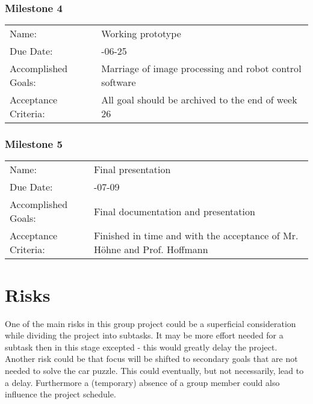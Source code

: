 \documentclass[a4paper, 12pt]{scrartcl}%
\newcommand{\explanation}[1]{{\sffamily #1}}
\begin{document}
	\subsubsection*{Milestone 4}
	\begin{tabular}{lp{10cm}}
		Name:      & \explanation{Working prototype}\\
		Due Date: & \explanation{2019-06-25}\\
		Accomplished Goals: & \explanation{Marriage of image processing and robot control software}\\
		Acceptance Criteria: & \explanation{All goal should be archived to the end of week 26}
	\end{tabular}
	\subsubsection*{Milestone 5}
	\begin{tabular}{lp{10cm}}
		Name:      & \explanation{Final presentation}\\
		Due Date: & \explanation{2019-07-09}\\
		Accomplished Goals: & \explanation{Final documentation and presentation}\\
		Acceptance Criteria: & \explanation{Finished in time and with the acceptance of Mr. Höhne and Prof. Hoffmann}
	\end{tabular}
	
	
	\section{Risks}
	One of the main risks in this group project could be a superficial consideration while dividing the project into subtasks. It may be more effort needed for a subtask then in this stage excepted - this would greatly delay the project. Another risk could be that focus will be shifted to secondary goals that are not needed to solve the car puzzle. This could eventually, but not necessarily, lead to a delay. Furthermore a (temporary) absence of a group member could also influence the project schedule.
	
\end{document}
